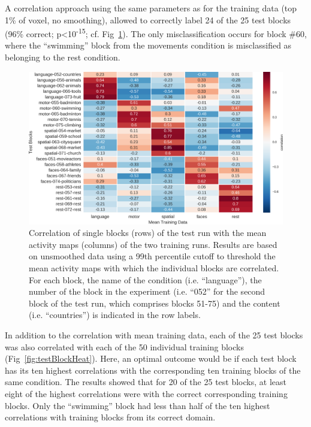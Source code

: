 \documentclass[fleqn,10pt]{SelfArx} %
\begin{document}
A correlation approach using the same parameters as for the training data (top 1\% of voxel, no smoothing), allowed to correctly label 24 of the 25 test blocks (96\% correct; p<10\textsuperscript{-15}; cf. Fig~\ref{fig:testMeanHeat}). The only misclassification occurs for block \#60, where the “swimming” block from the movements condition is misclassified as belonging to the rest condition. 
 
\begin{figure}[htbp]
	\begin{minipage}{\textwidth}
		\renewcommand{\familydefault}{\sfdefault}\normalfont
		\centering
		\includegraphics[width=\columnwidth]{./figs/fig7_testMeanHeat.png}
				\vspace*{-3mm}
		\caption{Correlation of single blocks (rows) of the test run with the mean activity maps (columns) of the two training runs. Results are based on unsmoothed data using a 99th percentile cutoff to threshold the mean activity maps with which the individual blocks are correlated. For each block, the name of the condition (i.e. “language”), the number of the block in the experiment (i.e. “052” for the second block of the test run, which comprises blocks 51-75) and the content (i.e. “countries”) is indicated in the row labels.}%
		\label{fig:testMeanHeat}
	\end{minipage}
\end{figure}

In addition to the correlation with mean training data, each of the 25 test blocks was also correlated with each of the 50 individual training blocks (Fig~\ref{fig:testBlockHeat}). Here, an optimal outcome would be if each test block has its ten highest correlations with the corresponding ten training blocks of the same condition. The results showed that for 20 of the 25 test blocks, at least eight of the highest correlations were with the correct corresponding training blocks. Only the “swimming” block had less than half of the ten highest correlations with training blocks from its correct domain.
\end{document}
